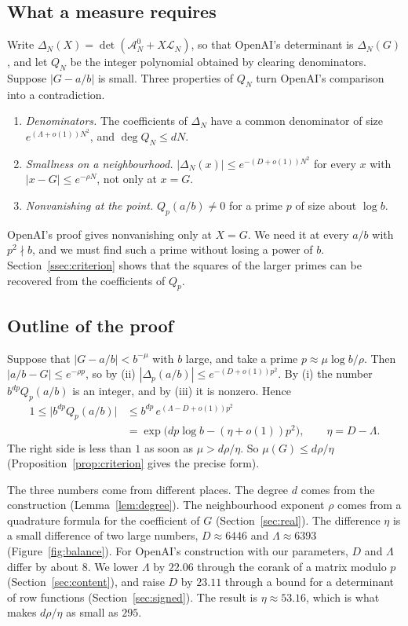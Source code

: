\documentclass[11pt]{amsart}
\theoremstyle{definition}
\theoremstyle{remark}
\numberwithin{equation}{section}
\newcommand{\cA}{\mathcal A}
\newcommand{\cL}{\mathcal L}
\begin{document}
\subsection{What a measure requires}\label{sec:intro-need}
Write $\Delta_N(X)=\det(\cA^0_N+X\cL_N)$, so that OpenAI's determinant is $\Delta_N(G)$, and let $Q_N$ be
the integer polynomial obtained by clearing denominators. Suppose $|G-a/b|$ is small. Three properties of
$Q_N$ turn OpenAI's comparison into a contradiction.
\begin{enumerate}[label=(\roman*)]
\item \emph{Denominators.} The coefficients of $\Delta_N$ have a common denominator of size
 $e^{(\Lambda+o(1))N^2}$, and $\deg Q_N\le dN$.
\item \emph{Smallness on a neighbourhood.} $|\Delta_N(x)|\le e^{-(D+o(1))N^2}$ for every $x$ with
 $|x-G|\le e^{-\rho N}$, not only at $x=G$.
\item \emph{Nonvanishing at the point.} $Q_p(a/b)\ne0$ for a prime $p$ of size about $\log b$.
\end{enumerate}
OpenAI's proof gives nonvanishing only at $X=G$. We need it at every $a/b$ with $p^2\nmid b$, and we must
find such a prime without losing a power of $b$. Section~\ref{ssec:criterion} shows that the squares of
the larger primes can be recovered from the coefficients of $Q_p$.

\subsection{Outline of the proof}\label{sec:outline}
Suppose that $|G-a/b|<b^{-\mu}$ with $b$ large, and take a prime $p\approx\mu\log b/\rho$. Then
$|a/b-G|\le e^{-\rho p}$, so by (ii) $|\Delta_p(a/b)|\le e^{-(D+o(1))p^2}$. By (i) the number
$b^{dp}Q_p(a/b)$ is an integer, and by (iii) it is nonzero. Hence
\begin{align*}
 1\le\bigl|b^{dp}Q_p(a/b)\bigr|&\le b^{dp}\,e^{(\Lambda-D+o(1))p^2}\\
 &=\exp\bigl(dp\log b-(\eta+o(1))p^2\bigr),\qquad \eta=D-\Lambda .
\end{align*}
The right side is less than $1$ as soon as $\mu>d\rho/\eta$. So $\mu(G)\le d\rho/\eta$
(Proposition~\ref{prop:criterion} gives the precise form).

The three numbers come from different places. The degree $d$ comes from the construction
(Lemma~\ref{lem:degree}). The neighbourhood exponent $\rho$ comes from a quadrature formula for the
coefficient of $G$ (Section~\ref{sec:real}). The difference $\eta$ is a small difference of two large
numbers, $D\approx6446$ and $\Lambda\approx6393$ (Figure~\ref{fig:balance}). For OpenAI's construction with
our parameters, $D$ and $\Lambda$ differ by about $8$. We lower $\Lambda$ by $22.06$ through the corank of
a matrix modulo $p$ (Section~\ref{sec:content}), and raise $D$ by $23.11$ through a bound for a
determinant of row functions (Section~\ref{sec:signed}). The result is $\eta\approx53.16$, which is what
makes $d\rho/\eta$ as small as $295$.
\end{document}
